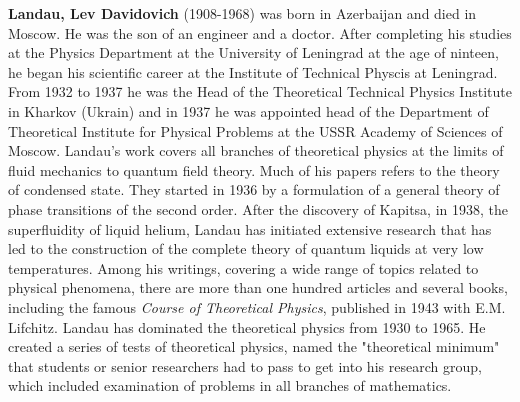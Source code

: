 \textbf{Landau, Lev Davidovich} (1908-1968) was born in Azerbaijan and died in Moscow. He was the son of an engineer and a doctor. After completing his studies at the Physics Department at the University of Leningrad at the age of ninteen, he began his scientific career at the Institute of Technical Physcis at Leningrad. From 1932 to 1937 he was the Head of the Theoretical Technical Physics  Institute in Kharkov (Ukrain) and in 1937 he was appointed head of the Department of Theoretical Institute for Physical Problems at the USSR Academy of Sciences of Moscow. Landau's work covers all branches of theoretical physics at the limits of fluid mechanics to quantum field theory. Much of his papers refers to the theory of condensed state. They started in 1936 by a formulation of a general theory of phase transitions of the second order. After the discovery of Kapitsa, in 1938, the superfluidity of liquid helium, Landau has initiated extensive research that has led to the construction of the complete theory of quantum liquids at very low temperatures. Among his writings, covering a wide range of topics related to physical phenomena, there are more than one hundred articles and several books, including the famous \textit{Course of Theoretical Physics}, published in 1943 with E.M. Lifchitz. Landau has dominated the theoretical physics from 1930 to 1965. He created a series of tests of theoretical physics, named the "theoretical minimum" that students or senior researchers had to pass to get into his research group, which included examination of problems in all branches of mathematics.

